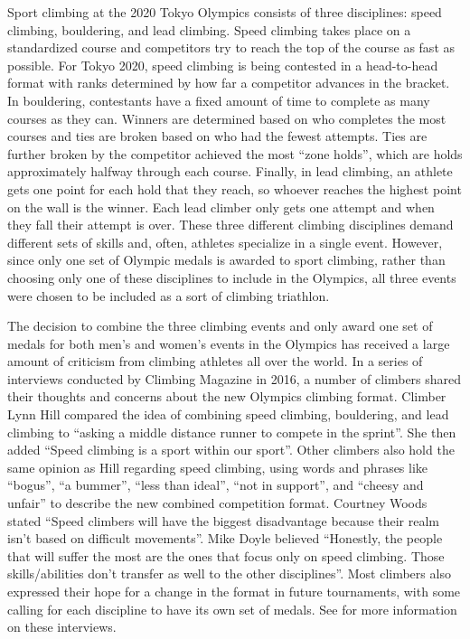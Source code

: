 \documentclass[12pt]{article}
\begin{document}
Sport climbing at the 2020 Tokyo Olympics consists of three disciplines:
speed climbing, bouldering, and lead climbing. Speed climbing takes
place on a standardized course and competitors try to reach the top of
the course as fast as possible. For Tokyo 2020, speed climbing is being
contested in a head-to-head format with ranks determined by how far a
competitor advances in the bracket. In bouldering, contestants have a
fixed amount of time to complete as many courses as they can. Winners
are determined based on who completes the most courses and ties are
broken based on who had the fewest attempts. Ties are further broken by
the competitor achieved the most ``zone holds'', which are holds
approximately halfway through each course. Finally, in lead climbing, an
athlete gets one point for each hold that they reach, so whoever reaches
the highest point on the wall is the winner. Each lead climber only gets
one attempt and when they fall their attempt is over. These three
different climbing disciplines demand different sets of skills and,
often, athletes specialize in a single event. However, since only one
set of Olympic medals is awarded to sport climbing, rather than choosing
only one of these disciplines to include in the Olympics, all three
events were chosen to be included as a sort of climbing triathlon.

The decision to combine the three climbing events and only award one set
of medals for both men's and women's events in the Olympics has received
a large amount of criticism from climbing athletes all over the world.
In a series of interviews conducted by Climbing Magazine in 2016, a
number of climbers shared their thoughts and concerns about the new
Olympics climbing format. Climber Lynn Hill compared the idea of
combining speed climbing, bouldering, and lead climbing to ``asking a
middle distance runner to compete in the sprint''. She then added
``Speed climbing is a sport within our sport''. Other climbers also hold
the same opinion as Hill regarding speed climbing, using words and
phrases like ``bogus'', ``a bummer'', ``less than ideal'', ``not in
support'', and ``cheesy and unfair'' to describe the new combined
competition format. Courtney Woods stated ``Speed climbers will have the
biggest disadvantage because their realm isn't based on difficult
movements''. Mike Doyle believed ``Honestly, the people that will suffer
the most are the ones that focus only on speed climbing. Those
skills/abilities don't transfer as well to the other disciplines''. Most
climbers also expressed their hope for a change in the format in future
tournaments, with some calling for each discipline to have its own set
of medals. See \citet{blanchard2016} for more information on these
interviews.
\end{document}
